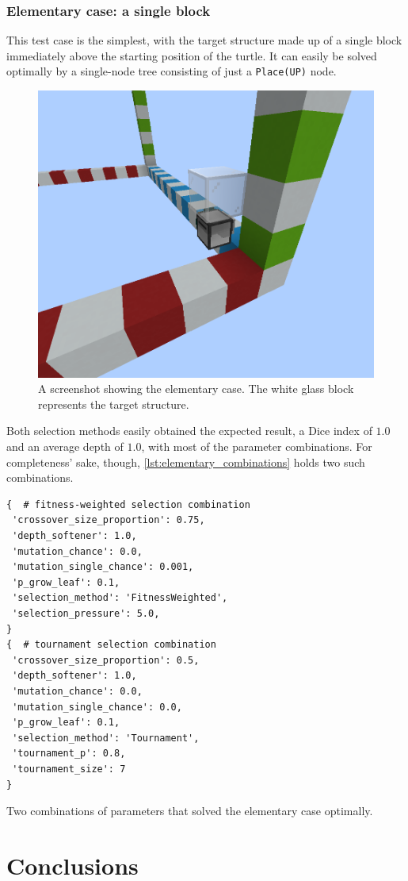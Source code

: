 \documentclass{report}
\begin{document}
\subsection{Elementary case: a single block}
This test case is the simplest, with the target structure made up of a single block immediately above the starting position of the turtle. It can easily be solved optimally by a single-node tree consisting of just a \verb|Place(UP)| node.

\begin{figure}[ht]
    \centering
    \includegraphics[scale=0.3]{minecraft2}
    \caption{A screenshot showing the elementary case. The white glass block represents the target structure.}
\end{figure}

Both selection methods easily obtained the expected result, a Dice index of $1.0$ and an average depth of $1.0$, with most of the parameter combinations. For completeness' sake, though, \autoref{lst:elementary_combinations} holds two such combinations.

\begin{listing}[ht]
    \begin{verbatim}
{  # fitness-weighted selection combination
 'crossover_size_proportion': 0.75,
 'depth_softener': 1.0,
 'mutation_chance': 0.0,
 'mutation_single_chance': 0.001,
 'p_grow_leaf': 0.1,
 'selection_method': 'FitnessWeighted',
 'selection_pressure': 5.0,
}
{  # tournament selection combination
 'crossover_size_proportion': 0.5,
 'depth_softener': 1.0,
 'mutation_chance': 0.0,
 'mutation_single_chance': 0.0,
 'p_grow_leaf': 0.1,
 'selection_method': 'Tournament',
 'tournament_p': 0.8,
 'tournament_size': 7
}
    \end{verbatim}
    \caption{Two combinations of parameters that solved the elementary case optimally.}
    \label{lst:elementary_combinations}
\end{listing}

\chapter{Conclusions}



\end{document}
